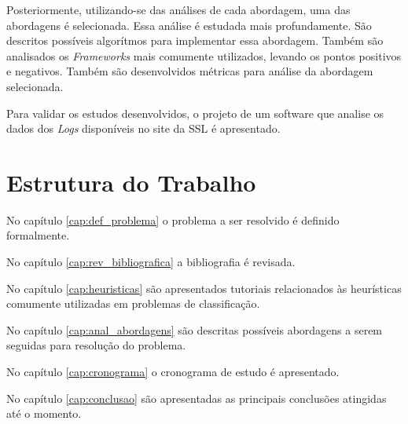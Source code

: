 Posteriormente, utilizando-se das análises de cada abordagem, uma das abordagens
é selecionada. Essa análise é estudada mais profundamente. São descritos possíveis 
algorítmos para implementar essa abordagem. Também são analisados os 
\textit{Frameworks} mais comumente utilizados, levando os pontos positivos e 
negativos. Também são desenvolvidos métricas para análise da abordagem selecionada.

Para validar os estudos desenvolvidos, o projeto de um software
que analise os dados dos \textit{Logs} disponíveis no site da SSL é apresentado.

\section{Estrutura do Trabalho}

No capítulo \ref{cap:def_problema} o problema a ser resolvido é definido formalmente.

No capítulo \ref{cap:rev_bibliografica} a bibliografia é revisada.

No capítulo \ref{cap:heuristicas} são apresentados tutoriais relacionados às 
heurísticas comumente utilizadas em problemas de classificação.

No capítulo \ref{cap:anal_abordagens} são descritas possíveis abordagens a serem
seguidas para resolução do problema.

No capítulo \ref{cap:cronograma} o cronograma de estudo é apresentado.

No capítulo \ref{cap:conclusao} são apresentadas as principais conclusões atingidas
até o momento.

